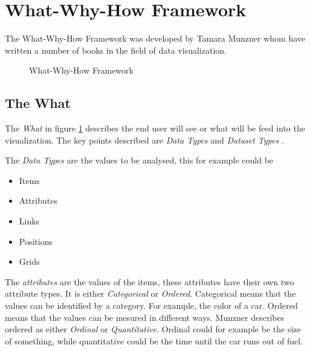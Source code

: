 \section{What-Why-How Framework} \label{sec:WhatWhyHow}

The What-Why-How Framework was developed by Tamara Munzner whom have written
a number of books in the field of data visualization. \cite{T2023VisualisationBookshelf} 

\begin{figure}[h]
    \centering
    \caption{What-Why-How Framework}
    \label{fig:WhatWhyHow}
\end{figure}

\subsection{The What}

The \textit{What} in figure \ref{fig:WhatWhyHow} describes the end user will 
see or what will be feed into the visualization. The key points described are
\textit{Data Types} and \textit{Dataset Types} \cite{Munzner2015VisualizationDesign}.

The \textit{Data Types} are the values to be analysed, this for example could be

\begin{itemize}
    \item Items
    \item Attributes
    \item Links
    \item Positions
    \item Grids
\end{itemize}

The \textit{attributes} are the values of the items, these attributes have their own two attribute types.
It is either \textit{Categorical} or \textit{Ordered}. Categorical means that the values can be identified
by a category. For example, the color of a car. Ordered means that the values can be mesured in different ways. 
Munzner describes ordered as either \textit{Ordinal} or \textit{Quantitative}.
Ordinal could for example be the size of something, while quantitative could be the time until the car runs 
out of fuel.

